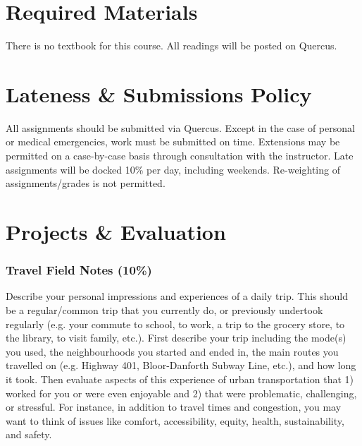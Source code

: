 \documentclass[11pt]{article}
\begin{document}
	
	
	\section*{Required Materials}
	
	There is no textbook for this course. All readings will be posted on Quercus.
	

	
	\section*{Lateness \& Submissions Policy}
	
	All assignments should be submitted via Quercus. Except in the case of personal or medical emergencies, work must be submitted on time. Extensions may be permitted on a case-by-case basis through consultation with the instructor. Late assignments will be docked 10\% per day, including weekends. Re-weighting of assignments/grades is not permitted.
	
	
	
	
		
	

	\section*{Projects \& Evaluation}
	
	
	\subsubsection*{Travel Field Notes (10\%)}
	
	Describe your personal impressions and experiences of a daily trip. This should be a regular/common trip that you currently do, or previously undertook regularly (e.g. your commute to school, to work, a trip to the grocery store, to the library, to visit family, etc.). First describe your trip including the mode(s) you used, the neighbourhoods you started and ended in, the main routes you travelled on (e.g. Highway 401, Bloor-Danforth Subway Line, etc.), and how long it took.
	Then evaluate aspects of this experience of urban transportation that 1) worked for you or were even enjoyable and 2) that were problematic, challenging, or stressful. For instance, in addition to travel times and congestion, you may want to think of issues like comfort, accessibility, equity, health, sustainability, and safety.	
	
\end{document}
